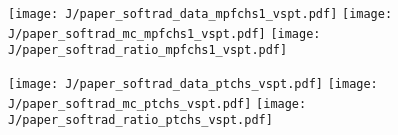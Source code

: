 \documentclass[landscape,10pt]{beamer} %
\begin{document}
\begin{figure}[p]
\centering
  \texttt{[image: J/paper\_softrad\_data\_mpfchs1\_vspt.pdf]}
  \texttt{[image: J/paper\_softrad\_mc\_mpfchs1\_vspt.pdf]}
  \texttt{[image: J/paper\_softrad\_ratio\_mpfchs1\_vspt.pdf]}
\end{figure}

\begin{figure}[p]
\centering
  \texttt{[image: J/paper\_softrad\_data\_ptchs\_vspt.pdf]}
  \texttt{[image: J/paper\_softrad\_mc\_ptchs\_vspt.pdf]}
  \texttt{[image: J/paper\_softrad\_ratio\_ptchs\_vspt.pdf]}
\end{figure}

\newpage

\end{document}
